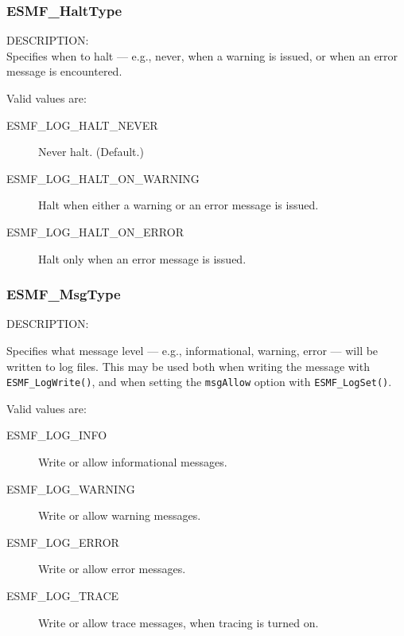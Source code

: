

\subsubsection{ESMF\_HaltType}

\label{opt:Halttype}
{\sf DESCRIPTION:\\}
Specifies when to halt --- e.g., never, when a warning is issued, or when an
error message is encountered.

Valid values are:
\begin{description}
   \item [ESMF\_LOG\_HALT\_NEVER] 
         Never halt.  (Default.)
   \item [ESMF\_LOG\_HALT\_ON\_WARNING]
         Halt when either a warning or an error message is issued.
   \item [ESMF\_LOG\_HALT\_ON\_ERROR]
         Halt only when an error message is issued.
\end{description}

\subsubsection{ESMF\_MsgType}

\label{opt:msgtype}
{\sf DESCRIPTION:\\}
\begin{sloppypar}
Specifies what message level --- e.g., informational, warning, 
error --- will be written to log files.  This may be used both when
writing the message with {\tt ESMF\_LogWrite()}, and when setting the
{\tt msgAllow} option with {\tt ESMF\_LogSet()}.
\end{sloppypar}

Valid values are:
\begin{description}
   \item [ESMF\_LOG\_INFO] 
         Write or allow informational messages.
   \item [ESMF\_LOG\_WARNING]
         Write or allow warning messages.
   \item [ESMF\_LOG\_ERROR]
         Write or allow error messages.
   \item [ESMF\_LOG\_TRACE]
         Write or allow trace messages, when tracing is turned on.
\end{description}

